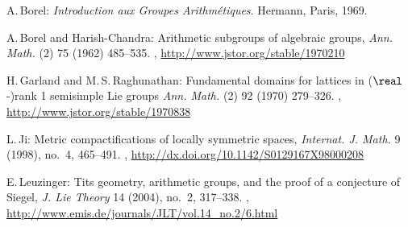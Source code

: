 \begin{references}{9}

A.\,Borel:
\emph{Introduction aux Groupes Arithm\'etiques}.
Hermann, Paris, 1969.

A.\,Borel and Harish-Chandra:
 Arithmetic subgroups of algebraic groups,
 \emph{Ann. Math.} (2) 75 (1962) 485--535.
,
\maynewline
\url{http://www.jstor.org/stable/1970210}


H.\,Garland and M.\,S.\,Raghunathan:
Fundamental domains for lattices in ($\real$-)rank 1 semisimple Lie groups
\emph{Ann. Math.} (2) 92 (1970) 279--326.
,
\maynewline
\url{http://www.jstor.org/stable/1970838}



 


L.\,Ji:
Metric compactifications of locally symmetric spaces,
\emph{Internat. J. Math.} 9 (1998), no.~4, 465--491. 
,
\maynewline
\url{http://dx.doi.org/10.1142/S0129167X98000208}

E.\,Leuzinger:
Tits geometry, arithmetic groups, and the proof of a conjecture of Siegel,
\emph{J. Lie Theory} 14 (2004), no.~2, 317--338. 
,
\maynewline
\url{http://www.emis.de/journals/JLT/vol.14_no.2/6.html}


\end{references}
